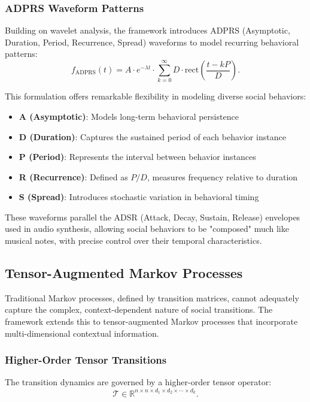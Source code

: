 \documentclass[11pt,a4paper]{article}
\begin{document}
\subsubsection{ADPRS Waveform Patterns}

Building on wavelet analysis, the framework introduces ADPRS (Asymptotic, Duration, Period, Recurrence, Spread) waveforms to model recurring behavioral patterns:
\begin{equation}
f_{\text{ADPRS}}(t) = A \cdot e^{-\lambda t} \cdot \sum_{k=0}^{\infty} D \cdot \text{rect}\left(\frac{t - kP}{D}\right).
\end{equation}

This formulation offers remarkable flexibility in modeling diverse social behaviors:
\begin{itemize}
\item \textbf{A (Asymptotic)}: Models long-term behavioral persistence
\item \textbf{D (Duration)}: Captures the sustained period of each behavior instance
\item \textbf{P (Period)}: Represents the interval between behavior instances
\item \textbf{R (Recurrence)}: Defined as $P/D$, measures frequency relative to duration
\item \textbf{S (Spread)}: Introduces stochastic variation in behavioral timing
\end{itemize}

These waveforms parallel the ADSR (Attack, Decay, Sustain, Release) envelopes used in audio synthesis, allowing social behaviors to be "composed" much like musical notes, with precise control over their temporal characteristics.

\subsection{Tensor-Augmented Markov Processes}

Traditional Markov processes, defined by transition matrices, cannot adequately capture the complex, context-dependent nature of social transitions. The framework extends this to tensor-augmented Markov processes that incorporate multi-dimensional contextual information.

\subsubsection{Higher-Order Tensor Transitions}

The transition dynamics are governed by a higher-order tensor operator:
\begin{equation}
\mathcal{T} \in \mathbb{R}^{n \times n \times d_1 \times d_2 \times \cdots \times d_k}.
\end{equation}
\end{document}
